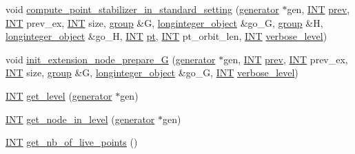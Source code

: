 \begin{DoxyCompactItemize}
\item 
void \mbox{\hyperlink{classoracle_a03cf03f7298da4a05fd1182893c74b4b}{compute\+\_\+point\+\_\+stabilizer\+\_\+in\+\_\+standard\+\_\+setting}} (\mbox{\hyperlink{classgenerator}{generator}} $\ast$gen, \mbox{\hyperlink{galois_8h_a09fddde158a3a20bd2dcadb609de11dc}{I\+NT}} \mbox{\hyperlink{classoracle_ad17b620d60e6cec94e9d22a9bc984177}{prev}}, \mbox{\hyperlink{galois_8h_a09fddde158a3a20bd2dcadb609de11dc}{I\+NT}} prev\+\_\+ex, \mbox{\hyperlink{galois_8h_a09fddde158a3a20bd2dcadb609de11dc}{I\+NT}} size, \mbox{\hyperlink{classgroup}{group}} \&G, \mbox{\hyperlink{classlonginteger__object}{longinteger\+\_\+object}} \&go\+\_\+G, \mbox{\hyperlink{classgroup}{group}} \&H, \mbox{\hyperlink{classlonginteger__object}{longinteger\+\_\+object}} \&go\+\_\+H, \mbox{\hyperlink{galois_8h_a09fddde158a3a20bd2dcadb609de11dc}{I\+NT}} \mbox{\hyperlink{classoracle_aa8c6db158546ea7a7e59bac20e981313}{pt}}, \mbox{\hyperlink{galois_8h_a09fddde158a3a20bd2dcadb609de11dc}{I\+NT}} pt\+\_\+orbit\+\_\+len, \mbox{\hyperlink{galois_8h_a09fddde158a3a20bd2dcadb609de11dc}{I\+NT}} \mbox{\hyperlink{simeon_8_c_a818073fbcc2f439e7c56952f67386122}{verbose\+\_\+level}})
\item 
void \mbox{\hyperlink{classoracle_afa9983d0c22028563d6a6b812c888b32}{init\+\_\+extension\+\_\+node\+\_\+prepare\+\_\+G}} (\mbox{\hyperlink{classgenerator}{generator}} $\ast$gen, \mbox{\hyperlink{galois_8h_a09fddde158a3a20bd2dcadb609de11dc}{I\+NT}} \mbox{\hyperlink{classoracle_ad17b620d60e6cec94e9d22a9bc984177}{prev}}, \mbox{\hyperlink{galois_8h_a09fddde158a3a20bd2dcadb609de11dc}{I\+NT}} prev\+\_\+ex, \mbox{\hyperlink{galois_8h_a09fddde158a3a20bd2dcadb609de11dc}{I\+NT}} size, \mbox{\hyperlink{classgroup}{group}} \&G, \mbox{\hyperlink{classlonginteger__object}{longinteger\+\_\+object}} \&go\+\_\+G, \mbox{\hyperlink{galois_8h_a09fddde158a3a20bd2dcadb609de11dc}{I\+NT}} \mbox{\hyperlink{simeon_8_c_a818073fbcc2f439e7c56952f67386122}{verbose\+\_\+level}})
\item 
\mbox{\hyperlink{galois_8h_a09fddde158a3a20bd2dcadb609de11dc}{I\+NT}} \mbox{\hyperlink{classoracle_a2990dc12dcb1f068aee2f2d59794c156}{get\+\_\+level}} (\mbox{\hyperlink{classgenerator}{generator}} $\ast$gen)
\item 
\mbox{\hyperlink{galois_8h_a09fddde158a3a20bd2dcadb609de11dc}{I\+NT}} \mbox{\hyperlink{classoracle_a4ac71e4eb496ebd67bb6c2475153a6b4}{get\+\_\+node\+\_\+in\+\_\+level}} (\mbox{\hyperlink{classgenerator}{generator}} $\ast$gen)
\item 
\mbox{\hyperlink{galois_8h_a09fddde158a3a20bd2dcadb609de11dc}{I\+NT}} \mbox{\hyperlink{classoracle_aba9c327407f45d29c1e66f445983a9e7}{get\+\_\+nb\+\_\+of\+\_\+live\+\_\+points}} ()

\end{DoxyCompactItemize}
